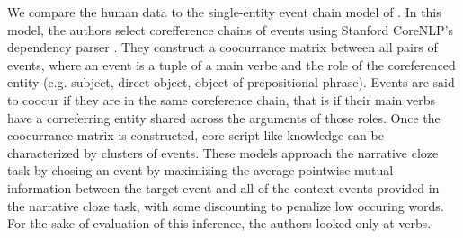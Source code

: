 \documentclass[10pt,a4paper]{article}
\begin{document}
We compare the human data to the single-entity event chain model of . In this model, the authors select corefference chains of events using Stanford CoreNLP's dependency parser \cite{corenlp,depparse}. They construct a coocurrance matrix between all pairs of events, where an event is a tuple of a main verbe and the role of the coreferenced entity (e.g. subject, direct object, object of prepositional phrase). Events are said to coocur if they are in the same coreference chain, that is if their main verbs have a correferring entity shared across the arguments of those roles. Once the coocurrance matrix is constructed, core script-like knowledge can be characterized by clusters of events. These models approach the narrative cloze task by chosing an event by maximizing the average pointwise mutual information between the target event and all of the context events provided in the narrative cloze task, with some discounting to penalize low occuring words. For the sake of evaluation of this inference, the authors looked only at verbs.
\end{document}
